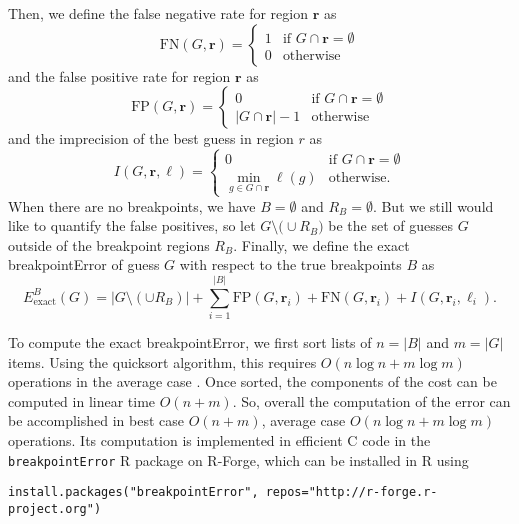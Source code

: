 \documentclass{jsfds} %
\renewcommand{\r}{ \mathbf{ r} }
\begin{document}
Then, we define the false negative rate for region $\r$ as 
\begin{equation}
  \label{eq:FN_i}
  \text{FN}(G,\r) = 
  \begin{cases}
    1 & \text{if } G\cap\r = \emptyset\\
    0 & \text{otherwise}
  \end{cases}
\end{equation}
and the false positive rate for region $\r$ as
\begin{equation}
  \label{eq:FP_i}
  \text{FP}(G,\r) =
  \begin{cases}
    0 & \text{if }G\cap\r = \emptyset\\
    |G\cap\r|-1 &\text{otherwise}
  \end{cases}
\end{equation}
and the imprecision of the best guess in region $r$ as
\begin{equation}
  \label{eq:imprecision}
  I(G,\r,\ell) =
  \begin{cases}
    0 & \text{if } G\cap\r = \emptyset\\
    \min_{g\in G\cap\r} \ell(g) & \text{otherwise}.
  \end{cases}
\end{equation}
When there are no breakpoints, we have $B=\emptyset$ and
$R_B=\emptyset$. But we still would like to quantify the false
positives, so let $G\setminus\big( \cup R_B\big) $ be the set of
guesses $G$ outside of the breakpoint regions $R_B$. Finally, we
define the exact breakpointError of guess $G$ with respect to the true
breakpoints $B$ as
\begin{equation}
  \label{eq:exact_breakpoint_cost}
  {E }_{\text{exact}}^B(G) =
  \big|G\setminus(\cup R_B)\big|
 + \sum_{i=1}^{|B|}\text{FP}(G,\r_i)+\text{FN}(G,\r_i)+I(G,\r_i,\ell_i).
\end{equation}

To compute the exact breakpointError, we first sort lists of $n=|B|$
and $m=|G|$ items. Using the quicksort algorithm, this requires
$O(n\log n + m\log m)$ operations in the average case
\citep{clrs}. Once sorted, the components of the cost can be computed
in linear time $O(n + m)$. So, overall the computation of the error
can be accomplished in best case $O(n + m)$, average case $O(n\log n +
m\log m)$ operations. Its computation is implemented in efficient C
code in the \verb|breakpointError| R package on R-Forge, which can be
installed in R using

\begin{verbatim}
install.packages("breakpointError", repos="http://r-forge.r-project.org")
\end{verbatim}
\end{document}
